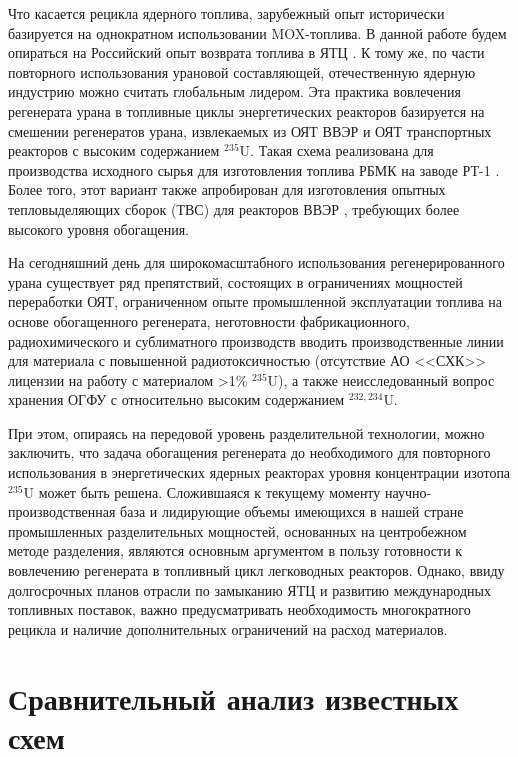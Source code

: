 Что касается рецикла ядерного топлива, зарубежный опыт исторически базируется на однократном использовании MOX-топлива.
В данной работе будем опираться на Российский опыт возврата топлива в ЯТЦ \cite{international2003iaea}.
К тому же, по части повторного использования урановой составляющей, отечественную ядерную индустрию можно считать глобальным лидером.
Эта практика вовлечения регенерата урана в топливные циклы энергетических реакторов базируется на смешении регенератов урана, извлекаемых из ОЯТ ВВЭР и ОЯТ транспортных реакторов с высоким содержанием $^{235}$U.
Такая схема реализована для производства исходного сырья для изготовления топлива РБМК на заводе РТ-1 \cite{volkVozvratUranaIz2010}.
Более того, этот вариант также апробирован для изготовления опытных тепловыделяющих сборок (ТВС) для реакторов ВВЭР \cite{proselkovAnalizVozmozhnostiIspolzovaniya2003}, требующих более высокого уровня обогащения.

На сегодняшний день для широкомасштабного использования регенерированного урана существует ряд препятствий, состоящих в ограничениях мощностей переработки ОЯТ, ограниченном опыте промышленной эксплуатации топлива на основе обогащенного регенерата, неготовности фабрикационного, радиохимического и сублиматного производств вводить производственные линии для материала с повышенной радиотоксичностью (отсутствие АО <<СХК>> лицензии на работу с материалом >1\% $^{235}$U), а также неисследованный вопрос хранения ОГФУ с относительно высоким содержанием $^{232,234}$U.

При этом, опираясь на передовой уровень разделительной технологии, можно заключить, что задача обогащения регенерата до необходимого для повторного использования в энергетических ядерных реакторах уровня концентрации изотопа $^{235}$U может быть решена.
Сложившаяся к текущему моменту научно-производственная база и лидирующие объемы имеющихся в нашей стране промышленных разделительных мощностей, основанных на центробежном методе разделения, являются основным аргументом в пользу готовности к вовлечению регенерата в топливный цикл легководных реакторов.
Однако, ввиду долгосрочных планов отрасли по замыканию ЯТЦ и развитию международных топливных поставок, важно предусматривать необходимость  многократного рецикла и наличие дополнительных ограничений на расход материалов.

\section{Сравнительный анализ известных схем}

